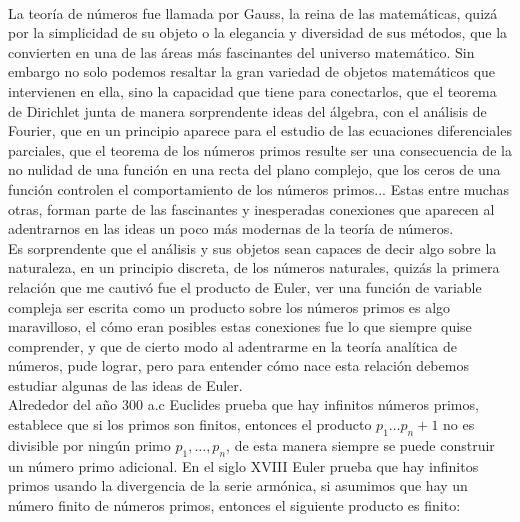 
\thispagestyle{empty}
\vspace{-0.5cm}

\\

La teoría de  números fue llamada por Gauss, la reina de las matemáticas, quizá por la simplicidad de su objeto o la elegancia y diversidad de sus métodos, que la convierten en una de las áreas más fascinantes del universo matemático. Sin embargo no solo podemos resaltar la gran variedad de objetos matemáticos que intervienen en ella, sino la capacidad que tiene para conectarlos, que el teorema de Dirichlet junta de manera sorprendente ideas del álgebra, con el análisis de Fourier, que  en un principio aparece para el estudio de las ecuaciones diferenciales parciales, que el teorema de los números primos resulte ser una consecuencia de la no nulidad de una función en una recta del plano complejo, que los ceros de  una función controlen el comportamiento de los números primos... Estas entre muchas otras, forman parte de las fascinantes y inesperadas conexiones que aparecen al adentrarnos en las ideas un poco más modernas de la teoría de números.\\

Es sorprendente que el análisis y sus objetos sean capaces de decir algo sobre la naturaleza, en un principio discreta, de los números naturales, quizás la primera relación que me cautivó fue el producto de Euler, ver una función de variable compleja ser escrita como un producto sobre los números primos es algo maravilloso, el cómo eran posibles estas conexiones fue lo que siempre quise comprender, y que de cierto modo al adentrarme en la teoría analítica de números, pude  lograr, pero para entender cómo nace esta relación debemos estudiar algunas de las ideas de Euler. \\

Alrededor del año 300 a.c Euclides prueba que hay infinitos números primos, establece que si los primos son finitos, entonces el producto $p_1\ldots p_n+1$ no es divisible por ningún primo $p_1,\ldots,p_n$, de esta manera siempre se puede construir un número primo adicional. En el siglo XVIII Euler prueba que hay infinitos primos usando la divergencia de la serie armónica, si asumimos que hay un número finito de números primos, entonces el siguiente producto es finito:


